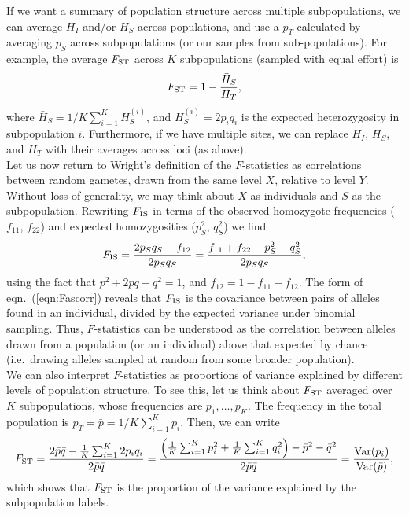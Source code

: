 If we want a summary of
population structure across multiple subpopulations, we can average $H_I$
and/or $H_S$ across populations, and use a $p_T$ calculated by
averaging $p_S$ across subpopulations (or our samples from sub-populations). For example, the average $F_{\mathrm{ST}}$ across $K$ subpopulations (sampled with equal effort) is
\begin{equation}
	F_{\mathrm{ST}} = 1 - \frac{\bar{H}_{S}}{H_T},
\end{equation}
where $\bar{H}_S = 1/K \sum_{i = 1}^{K} H_{S}^{(i)}$, and $H_{S}^{(i)} = 2 p_{i} q_{i}$ is the expected heterozygosity in subpopulation $i$.
Furthermore, if we have multiple sites, we can replace $H_I$, $H_S$, and $H_T$ with their averages across loci (as above). \\

Let us now return to Wright's definition of the $F$-statistics as correlations between random gametes, drawn from the same level $X$,
relative to level $Y$. Without loss of generality, we may think about $X$ as
individuals and $S$ as the subpopulation.
Rewriting $F_{\mathrm{IS}}$ in terms of the observed homozygote frequencies ($f_{11}$, $f_{22}$) and expected homozygosities ($p_{S}^2$, $q_{S}^2$) we find
\begin{equation}
F_{\mathrm{IS}} = \frac{2p_Sq_S - f_{12}}{2p_Sq_S} = \frac{f_{11}+f_{22} -
p_S^2 - q_S^2}{2p_Sq_S},
\label{eqn:Fascorr}
\end{equation}
using the fact that $p^2+2pq+q^2=1$, and $f_{12} = 1 - f_{11} - f_{12}$. The form of eqn.\ (\ref{eqn:Fascorr}) reveals that $F_{\mathrm{IS}}$ is the covariance between pairs of alleles
found in an individual, divided by the
expected variance under binomial sampling. Thus, $F$-statistics can be
understood as the correlation between alleles drawn from a population
(or an individual) above that expected by chance (i.e.\ drawing alleles
sampled at random from some broader population).\\

We can also interpret $F$-statistics as proportions of variance explained by
different levels of population structure. To see this, let us think about $F_{\mathrm{ST}}$ averaged over $K$
subpopulations, whose frequencies are $p_1,\dots,p_K$. The
frequency in the total population is $p_T=\bar{p} = 1/K \sum_{i=1}^K p_i$.
Then, we can
write
\begin{equation}
F_{\mathrm{ST}} = \frac{2 \bar{p}\bar{q} - \frac{1}{K}\sum_{i=1}^K 2p_iq_i }{2
\bar{p}\bar{q}} = \frac{ \left(\frac{1}{K} \sum_{i=1}^K p_i^2 +
\frac{1}{K} \sum_{i=1}^K q_i^2 \right) -  \bar{p}^2-\bar{q}^2 }{2
\bar{p}\bar{q}} = \frac{\mathrm{Var}(p_i)}{\mathrm{Var}(\bar{p})},
\label{eqn:F_as_propvar}
\end{equation}
which shows that $F_{\mathrm{ST}}$ is the proportion of the variance explained by the
subpopulation labels.


\newpage
